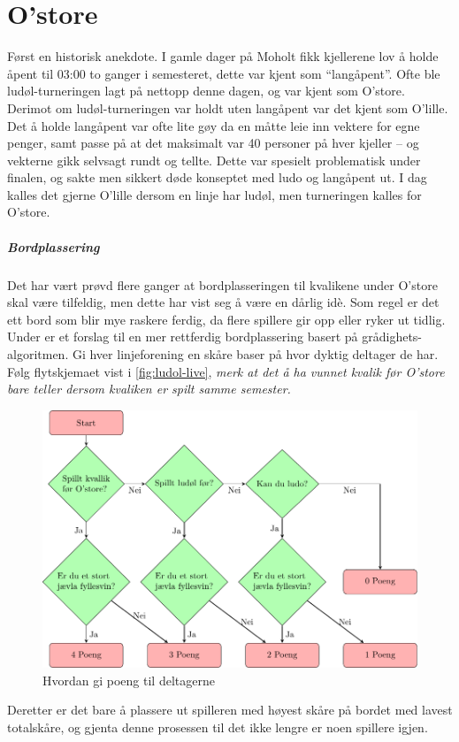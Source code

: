 \documentclass[10pt,a4paper,norsk,openany]{book}
\begin{document}
\chapter{O'store}
\label{chap:O-store}
Først en historisk anekdote. I gamle dager på Moholt fikk kjellerene lov å holde
åpent til 03:00 to ganger i semesteret, dette var kjent som ``langåpent''. Ofte
ble ludøl-turneringen lagt på nettopp denne dagen, og var kjent som O'store.
Derimot om ludøl-turneringen var holdt uten langåpent var det kjent som O'lille.
Det å holde langåpent var ofte lite gøy da en måtte leie inn vektere for egne
penger, samt passe på at det maksimalt var 40 personer på hver kjeller -- og
vekterne gikk selvsagt rundt og tellte. Dette var spesielt problematisk under
finalen, og sakte men sikkert døde konseptet med ludo og langåpent ut. I dag
kalles det gjerne O'lille dersom en linje har ludøl, men turneringen kalles for
O'store.

\paragraph{Bordplassering}

Det har vært prøvd flere ganger at bordplasseringen til kvalikene under O'store
skal være tilfeldig, men dette har vist seg å være en dårlig idè. Som regel er
det ett bord som blir mye raskere ferdig, da flere spillere gir opp eller ryker
ut tidlig. Under er et forslag til en mer rettferdig bordplassering basert på
grådighets-algoritmen. Gi hver linjeforening en skåre baser på hvor dyktig
deltager de har. Følg flytskjemaet vist i \cref{fig:ludol-live}, \emph{merk at det å
ha vunnet kvalik før O'store bare teller dersom kvaliken er spilt samme
semester.}
%
\begin{figure}[htbp!]
  \centering
  \includegraphics[width=\textwidth]{borplassering} 
  \caption{Hvordan gi poeng til deltagerne}
  \label{fig:borplassering}
\end{figure}
%
Deretter er det bare å plassere ut spilleren med høyest skåre på bordet med
lavest totalskåre, og gjenta denne prosessen til det ikke lengre er noen
spillere igjen.
\end{document}
